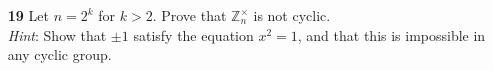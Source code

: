 \documentclass[paper=usletter, fontsize=12pt]{article}
\begin{document}
\begin{itemize}
\begin{itemize}
\begin{itemize}
            \end{itemize}

            \item[\textbf{19}] Let $n=2^k$ for $k>2$. Prove that
            $\mathbb{Z}_{n}^{\times}$ is not cyclic. \\ \textit{Hint}: Show
            that $\pm 1$ satisfy the equation $x^2=1$, and that this is
            impossible in any cyclic group.
            \begin{cproof}
            \end{cproof}

        \end{itemize}

    \end{itemize}
\end{document}
